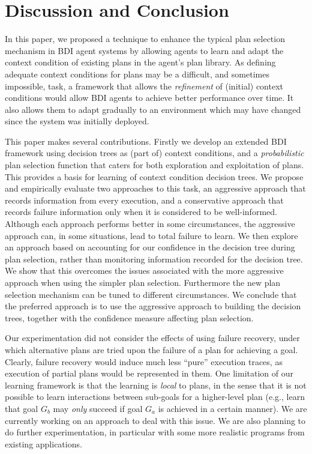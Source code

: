 \section{Discussion and Conclusion}\label{sec:discussion}

In this paper, we proposed a technique to enhance the typical plan selection
mechanism in BDI agent systems by allowing agents to learn and adapt the context
condition of existing plans in the agent's plan library.
As defining adequate context conditions for plans may be a difficult, and
sometimes impossible, task, a framework that allows the \emph{refinement} of
(initial) context conditions would allow BDI agents to achieve better performance
over time. It also allows them to adapt gradually to an environment which may
have changed since the system was initially deployed.


This paper makes several contributions. Firstly we develop an extended
BDI framework using decision trees as (part of) context conditions,
and a \textit{probabilistic} plan selection function that caters for
both exploration and exploitation of plans. This provides a basis for
learning of context condition decision trees.  We propose and
empirically evaluate two approaches to this task, an aggressive
approach that records information from every execution, and a
conservative approach that records failure information only when it is
considered to be well-informed. Although each approach performs better
in some circumstances, the aggressive approach can, in some
situations, lead to total failure to learn. We then explore an
approach based on accounting for our confidence in the decision tree
during plan selection, rather than monitoring information recorded for
the decision tree. We show that this overcomes the issues associated
with the more aggressive approach when using the simpler plan
selection. Furthermore the new plan selection mechanism can be tuned to
different circumstances. We conclude that the preferred approach is to
use the aggressive approach to building the decision trees, together
with the confidence measure affecting plan selection.

Our experimentation did not consider the effects of using failure
recovery, under which alternative plans are tried upon the failure of
a plan for achieving a goal. Clearly, failure recovery would induce
much less ``pure'' execution traces, as execution of partial plans
would be represented in them. 
%
One limitation of our learning framework is that the learning is
\emph{local} to plans, in the sense that it is not possible to learn
interactions between sub-goals for a higher-level plan (e.g., learn
that goal $G_b$ may \textit{only} succeed if goal $G_a$ is achieved in
a certain manner). We are currently working on an approach to deal
with this issue.
%
We are also planning to do further experimentation, in particular with some more realistic
programs from existing applications. 


